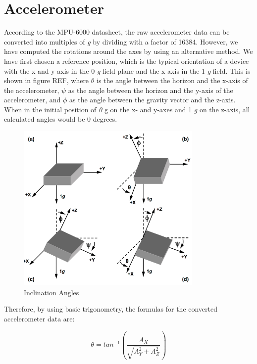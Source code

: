 \section{Accelerometer}
According to the MPU-6000 datasheet\cite{MPU6000}, the raw accelerometer data can be converted into multiples of \textit{g} by dividing with a factor of 16384. However, we have computed the rotations around the axes by using an alternative method. We have first chosen a reference position, which is the typical orientation of a device with the x and y axis in the 0 \textit{g} field plane and the x axis in the 1 \textit{g} field. This is shown in figure REF, where $\theta$ is the angle between the horizon and the x-axis of the accelerometer, $\psi$ as the angle between the horizon and the y-axis of the accelerometer, and
$\phi$ as the angle between the gravity vector and the z-axis. When in the initial position of \textit{0} g on the x- and y-axes and 1 \textit{g} on the z-axis, all calculated angles would be 0 degrees\cite{AccelCite1}.

\begin{figure}[H]
  \centering
    \includegraphics[width=0.8\textwidth]{images/accangle.png}
	\caption{Inclination Angles \cite{AccelCite1}}
	\label{acc}
\end{figure} 

Therefore, by using basic trigonometry, the formulas for the converted accelerometer data are:

\begin{equation}	
 	\theta=tan^{-1}(\frac{A_{X}}{\sqrt{A_{Y}^{2}+A_{Z}^{2}}})
 \end{equation}
 

